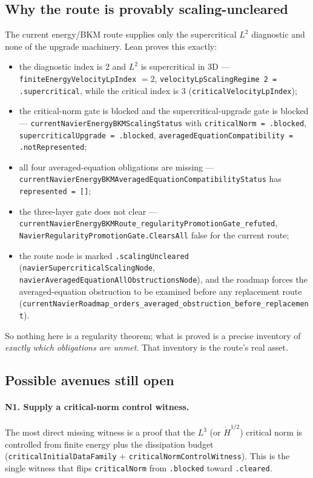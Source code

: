 \subsection{Why the route is provably scaling-uncleared}

The current energy/BKM route supplies only the supercritical $L^2$ diagnostic
and none of the upgrade machinery. Lean proves this exactly:
\begin{itemize}\itemsep1pt
  \item the diagnostic index is $2$ and $L^2$ is supercritical in 3D ---
    \verb|finiteEnergyVelocityLpIndex| $=2$,
    \verb|velocityLpScalingRegime 2 = .supercritical|, while the critical index
    is $3$ (\verb|criticalVelocityLpIndex|);
  \item the critical-norm gate is blocked and the supercritical-upgrade gate is
    blocked --- \verb|currentNavierEnergyBKMScalingStatus| with
    \verb|criticalNorm = .blocked|,
    \verb|supercriticalUpgrade = .blocked|,
    \verb|averagedEquationCompatibility = .notRepresented|;
  \item all four averaged-equation obligations are missing ---
    \verb|currentNavierEnergyBKMAveragedEquationCompatibilityStatus| has
    \verb|represented = []|;
  \item the three-layer gate does not clear ---
    \verb|currentNavierEnergyBKMRoute_regularityPromotionGate_refuted|,
    \verb|NavierRegularityPromotionGate.ClearsAll| false for the current route;
  \item the route node is marked \verb|.scalingUncleared|
    (\verb|navierSupercriticalScalingNode|,
    \verb|navierAveragedEquationAllObstructionsNode|), and the roadmap forces the
    averaged-equation obstruction to be examined before any replacement route
    (\verb|currentNavierRoadmap_orders_averaged_obstruction_before_replacement|).
\end{itemize}
So nothing here is a regularity theorem; what is proved is a precise inventory of
\emph{exactly which obligations are unmet}. That inventory is the route's real
asset.

\subsection{Possible avenues still open}

\paragraph{N1. Supply a critical-norm control witness.} The most direct missing
witness is a proof that the $L^3$ (or $\dot H^{1/2}$) critical norm is
controlled from finite energy plus the dissipation budget
(\verb|criticalInitialDataFamily| $+$ \verb|criticalNormControlWitness|). This is
the single witness that flips \verb|criticalNorm| from \verb|.blocked| toward
\verb|.cleared|.

